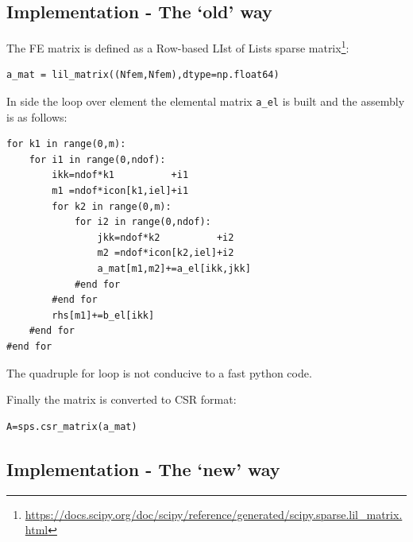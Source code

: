 \subsection*{Implementation - The `old' way}

The FE matrix is defined as a Row-based LIst of Lists sparse 
matrix\footnote{\url{https://docs.scipy.org/doc/scipy/reference/generated/scipy.sparse.lil_matrix.html}}:
\begin{lstlisting}
a_mat = lil_matrix((Nfem,Nfem),dtype=np.float64)
\end{lstlisting}
In side the loop over element the elemental matrix \lstinline{a_el} is built
and the assembly is as follows:

\begin{lstlisting}
for k1 in range(0,m):
    for i1 in range(0,ndof):
        ikk=ndof*k1          +i1
        m1 =ndof*icon[k1,iel]+i1
        for k2 in range(0,m):
            for i2 in range(0,ndof):
                jkk=ndof*k2          +i2
                m2 =ndof*icon[k2,iel]+i2
                a_mat[m1,m2]+=a_el[ikk,jkk]
            #end for
        #end for
        rhs[m1]+=b_el[ikk]
    #end for
#end for
\end{lstlisting}
The quadruple for loop is not conducive to a fast python code.

Finally the matrix is converted to CSR format:
\begin{lstlisting}
A=sps.csr_matrix(a_mat)
\end{lstlisting}


\subsection*{Implementation - The `new' way}


